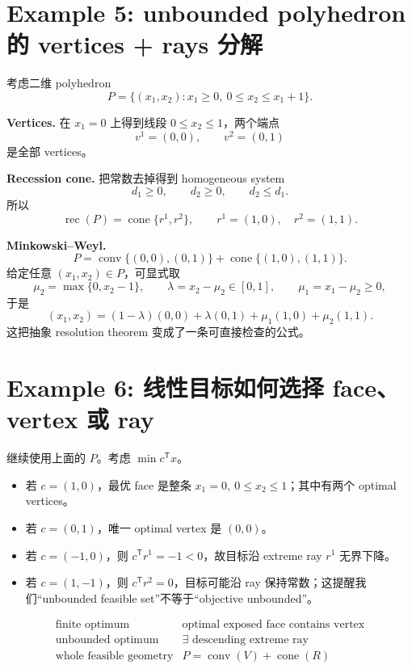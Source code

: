 \documentclass[11pt,a4paper,openany]{ctexrep}
\theoremstyle{definition}
\newcommand{\conv}{\operatorname{conv}}
\newcommand{\cone}{\operatorname{cone}}
\newcommand{\rec}{\operatorname{rec}}
\newcommand{\transpose}{\mathsf{T}}
\begin{document}
\section{Example 5: unbounded polyhedron 的 vertices + rays 分解}
考虑二维 polyhedron
\[
P=\{(x_1,x_2):x_1\ge0,\ 0\le x_2\le x_1+1\}.
\]

\textbf{Vertices.} 在 $x_1=0$ 上得到线段 $0\le x_2\le1$，两个端点
\[
v^1=(0,0),\qquad v^2=(0,1)
\]
是全部 vertices。

\textbf{Recession cone.} 把常数去掉得到 homogeneous system
\[
d_1\ge0,\qquad d_2\ge0,\qquad d_2\le d_1.
\]
所以
\[
\rec(P)=\cone\{r^1,r^2\},\qquad
r^1=(1,0),\quad r^2=(1,1).
\]

\textbf{Minkowski--Weyl.}
\[
P=\conv\{(0,0),(0,1)\}+\cone\{(1,0),(1,1)\}.
\]
给定任意 $(x_1,x_2)\in P$，可显式取
\[
\mu_2=\max\{0,x_2-1\},\qquad
\lambda=x_2-\mu_2\in[0,1],\qquad
\mu_1=x_1-\mu_2\ge0,
\]
于是
\[
(x_1,x_2)=(1-\lambda)(0,0)+\lambda(0,1)+\mu_1(1,0)+\mu_2(1,1).
\]
这把抽象 resolution theorem 变成了一条可直接检查的公式。

\section{Example 6: 线性目标如何选择 face、vertex 或 ray}
继续使用上面的 $P$。考虑 $\min c^\transpose x$。
\begin{itemize}[leftmargin=2em]
  \item 若 $c=(1,0)$，最优 face 是整条 $x_1=0,\ 0\le x_2\le1$；其中有两个 optimal vertices。
  \item 若 $c=(0,1)$，唯一 optimal vertex 是 $(0,0)$。
  \item 若 $c=(-1,0)$，则 $c^\transpose r^1=-1<0$，故目标沿 extreme ray $r^1$ 无界下降。
  \item 若 $c=(1,-1)$，则 $c^\transpose r^2=0$，目标可能沿 ray 保持常数；这提醒我们“unbounded feasible set”不等于“objective unbounded”。
\end{itemize}

\begin{keybox}[这个例子把三类结果放在一起]
\[
\begin{array}{c|c}
\text{finite optimum} & \text{optimal exposed face contains vertex}\\
\text{unbounded optimum} & \exists\text{ descending extreme ray}\\
\text{whole feasible geometry} & P=\conv(V)+\cone(R)
\end{array}
\]
\end{keybox}
\end{document}
